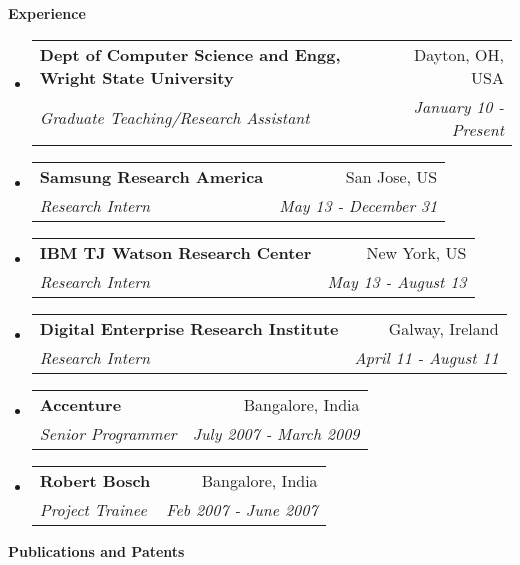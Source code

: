\documentclass[letterpaper,11pt]{article}
\makeatletter
\newcommand{\resheading}[1]{{\large \colorbox{mygrey}{\begin{minipage}{\textwidth}{\textbf{#1 \vphantom{p\^{E}}}}\end{minipage}}}}
\newcommand{\ressubheading}[4]{
\begin{tabular*}{7.0in}{l@{\extracolsep{\fill}}r}
		\textbf{#1} & #2 \\
		\textit{#3} & \textit{#4} \\
\end{tabular*}\vspace{-6pt}}
\makeatother
\begin{document}
\resheading{Experience}
\begin{itemize}
\item
	\ressubheading{Dept of Computer Science and Engg, Wright State University}{Dayton, OH, USA}{Graduate Teaching/Research Assistant}{January 10 - Present}
	\linebreak
\item
\ressubheading{Samsung Research America}{San Jose, US}{Research Intern}{May 13 - December 31}
	\linebreak
\item 
\ressubheading{IBM TJ Watson Research Center}{New York, US}{Research Intern}{May 13 - August 13}
	\linebreak
\item
	\ressubheading{Digital Enterprise Research Institute}{Galway, Ireland}{Research Intern}{April 11 - August 11}
	\linebreak
\item
	\ressubheading{Accenture}{Bangalore, India}{Senior Programmer}{July 2007 - March 2009}
	\linebreak
     
\item
	\ressubheading{Robert Bosch}{Bangalore, India}{Project Trainee}{Feb 2007 - June 2007}
	\linebreak
     
\end{itemize}
\resheading{Publications and Patents}
\end{document}
